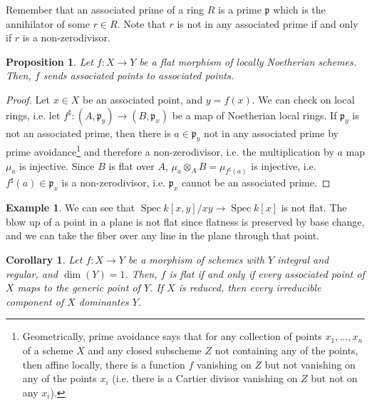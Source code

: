 \documentclass[10pt]{article}
\newtheorem{prop}[thm]{Proposition}
\newtheorem{cor}[thm]{Corollary}
\theoremstyle{definition}
\newtheorem{exmp}[thm]{Example}
\DeclareMathOperator{\Spec}{Spec}
\newcommand{\mf}{\mathfrak}
\newcommand{\OO}{\mathcal{O}}
\begin{document}
Remember that an associated prime of a ring $R$ is a prime $\mf{p}$ which is the annihilator of some $r \in R$.  Note that $r$ is not in any associated prime if and only if $r$ is a non-zerodivisor.
\begin{prop}
Let $f: X \rightarrow Y$ be a flat morphism of locally Noetherian schemes.  Then, $f$ sends associated points to associated points.
\end{prop}
\begin{proof}
Let $x \in X$ be an associated point, and $y = f(x)$.  We can check on local rings, i.e. let $f^\sharp: (A, \mf{p}_y) \rightarrow (B, \mf{p}_x)$ be a map of Noetherian local rings.  If $\mf{p}_y$ is not an associated prime, then there is $a \in \mf{p}_y$ not in any associated prime by prime avoidance\footnote{Geometrically, prime avoidance says that for any collection of points $x_1, \dots, x_n$ of a scheme $X$ and any closed subscheme $Z$ not containing any of the points, then affine locally, there is a function $f$ vanishing on $Z$ but not vanishing on any of the points $x_i$ (i.e. there is a Cartier divisor vanishing on $Z$ but not on any $x_i$).} and therefore a non-zerodivisor, i.e. the multiplication by $a$ map $\mu_a$ is injective.  Since $B$ is flat over $A$, $\mu_a \otimes_A B = \mu_{f^\sharp(a)}$ is injective, i.e. $f^\sharp(a) \in \mf{p}_x$ is a non-zerodivisor, i.e. $\mf{p}_x$ cannot be an associated prime.
\end{proof}

\begin{exmp}
We can see that $\Spec k[x,y]/xy \rightarrow \Spec k[x]$ is not flat.  The blow up of a point in a plane is not flat since flatness is preserved by base change, and we can take the fiber over any line in the plane through that point.
\end{exmp}

\begin{cor}
Let $f: X \rightarrow Y$ be a morphism of schemes with $Y$ integral and regular, and $\dim(Y) = 1$.  Then, $f$ is flat if and only if every associated point of $X$ maps to the generic point of $Y$.  If $X$ is reduced, then every irreducible component of $X$ dominantes $Y$.
\end{cor}

\end{document}

